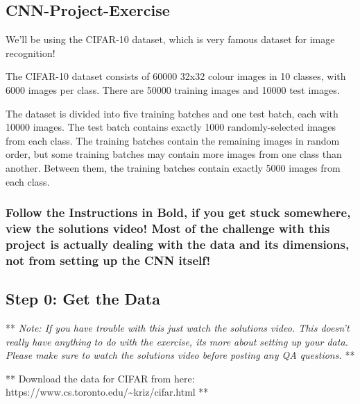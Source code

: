 \documentclass[11pt]{article}
\title{}
\date{}
\begin{document}
    
    
    \maketitle
    
    

    
    \subsection{CNN-Project-Exercise}\label{cnn-project-exercise}

We'll be using the CIFAR-10 dataset, which is very famous dataset for
image recognition!

The CIFAR-10 dataset consists of 60000 32x32 colour images in 10
classes, with 6000 images per class. There are 50000 training images and
10000 test images.

The dataset is divided into five training batches and one test batch,
each with 10000 images. The test batch contains exactly 1000
randomly-selected images from each class. The training batches contain
the remaining images in random order, but some training batches may
contain more images from one class than another. Between them, the
training batches contain exactly 5000 images from each class.

\subsubsection{Follow the Instructions in Bold, if you get stuck
somewhere, view the solutions video! Most of the challenge with this
project is actually dealing with the data and its dimensions, not from
setting up the CNN
itself!}\label{follow-the-instructions-in-bold-if-you-get-stuck-somewhere-view-the-solutions-video-most-of-the-challenge-with-this-project-is-actually-dealing-with-the-data-and-its-dimensions-not-from-setting-up-the-cnn-itself}

    \subsection{Step 0: Get the Data}\label{step-0-get-the-data}

** \emph{Note: If you have trouble with this just watch the solutions
video. This doesn't really have anything to do with the exercise, its
more about setting up your data. Please make sure to watch the solutions
video before posting any QA questions.} **

    ** Download the data for CIFAR from here:
https://www.cs.toronto.edu/\textasciitilde{}kriz/cifar.html **
\end{document}
